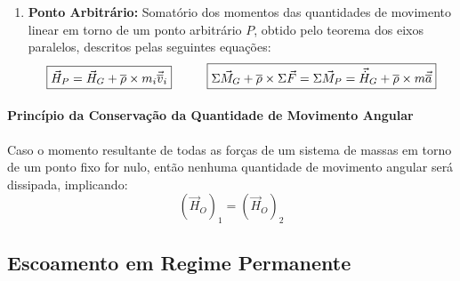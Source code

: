 \documentclass{article}
\begin{document}
\begin{enumerate}[rightmargin = \leftmargin]
                    \item \textbf{Ponto Arbitrário:} Somatório dos momentos das quantidades de movimento linear em torno de um ponto arbitrário $P$, obtido pelo teorema dos eixos paralelos, descritos pelas seguintes equações:
                        \begin{equation}
                            \boxed{
                                \vec{H}_{P} = 
                                \vec{H}_{G} + \overline{\rho}\times m_{i}\vec{\overline{v}}_{i}
                            }
                            \hspace{10mm}
                            \boxed{
                                \Sigma\vec{M}_{G} + \overline{\rho}\times\Sigma\vec{F} = 
                                \Sigma\vec{M}_{P} = 
                                \vec{\dot{H}}_{G} + \overline{\rho}\times m \vec{\overline{a}}
                            }
                        \end{equation}
                \end{enumerate}

            \paragraph{Princípio da Conservação da Quantidade de Movimento Angular}Caso o momento resultante de todas as forças de um sistema de massas em torno de um ponto fixo for nulo, então nenhuma quantidade de movimento angular será dissipada, implicando:
                \begin{equation}
                    \boxed{
                        (\vec{H}_{O})_{1} = (\vec{H}_{O})_{2}
                    }
                \end{equation}

        \subsection{Escoamento em Regime Permanente}
\end{document}

